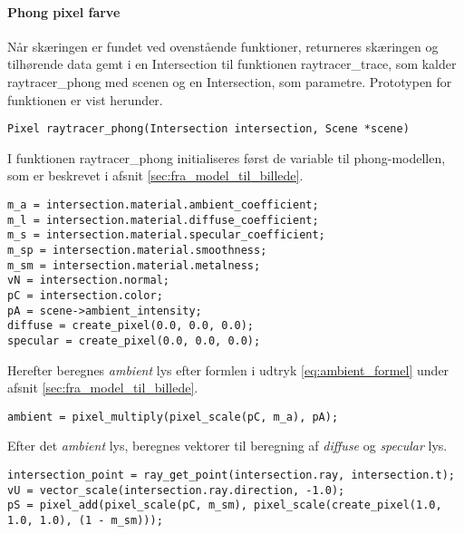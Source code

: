 \paragraph{Phong pixel farve}
Når skæringen er fundet ved ovenstående funktioner, returneres skæringen og tilhørende data gemt i en Intersection til funktionen raytracer\_trace, som kalder raytracer\_phong med scenen og en Intersection, som parametre. Prototypen for funktionen er vist herunder.

\begin{lstlisting}[style=Cstyle, caption=prototypen til funktionen der beregner pixelfarven på baggrund af data fra skæring med scenen.]
Pixel raytracer_phong(Intersection intersection, Scene *scene)
\end{lstlisting}

I funktionen raytracer\_phong initialiseres først de variable til phong-modellen, som er beskrevet i afsnit
 \ref{sec:fra_model_til_billede}.

\begin{lstlisting}[style=Cstyle, caption=Initialisering af variabler i raytracer\_phong.] 
m_a = intersection.material.ambient_coefficient;
m_l = intersection.material.diffuse_coefficient;
m_s = intersection.material.specular_coefficient;
m_sp = intersection.material.smoothness;
m_sm = intersection.material.metalness;
vN = intersection.normal;
pC = intersection.color;
pA = scene->ambient_intensity;
diffuse = create_pixel(0.0, 0.0, 0.0);
specular = create_pixel(0.0, 0.0, 0.0);
\end{lstlisting}

Herefter beregnes \textit{ambient} lys efter formlen i udtryk \ref{eq:ambient_formel} under afsnit \ref{sec:fra_model_til_billede}.

\begin{lstlisting}[style=Cstyle, caption=Beregning af ambient lys i raytracer\_phong.] 
ambient = pixel_multiply(pixel_scale(pC, m_a), pA);
\end{lstlisting}

Efter det \textit{ambient} lys, beregnes vektorer til beregning af \textit{diffuse} og \textit{specular} lys.

\begin{lstlisting}[style=Cstyle, caption={Beregning af skæring, vektor $\protect\vv{U}$ og pixel S i raytracer\_phong.}] 
intersection_point = ray_get_point(intersection.ray, intersection.t);
vU = vector_scale(intersection.ray.direction, -1.0);
pS = pixel_add(pixel_scale(pC, m_sm), pixel_scale(create_pixel(1.0, 1.0, 1.0), (1 - m_sm)));
\end{lstlisting}

